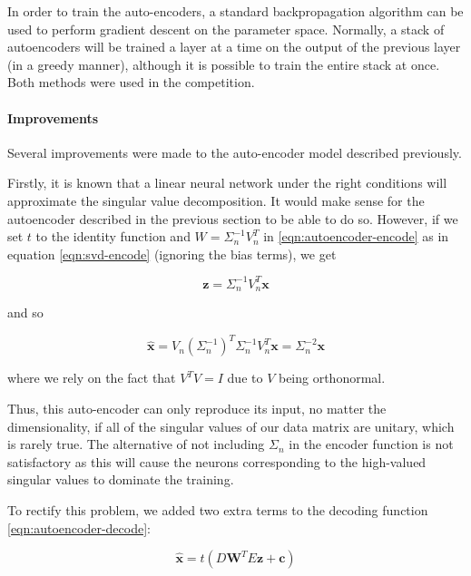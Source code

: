 \documentclass{article}
\begin{document}
In order to train the auto-encoders, a standard backpropagation algorithm can be used to perform gradient descent on the parameter space.  Normally, a stack of autoencoders will be trained a layer at a time on the output of the previous layer (in a greedy manner), although it is possible to train the entire stack at once.  Both methods were used in the competition.

\paragraph{Improvements}

Several improvements were made to the auto-encoder model described previously.

Firstly, it is known that a linear neural network under the right conditions will approximate the singular value decomposition.  It would make sense for the autoencoder described in the previous section to be able to do so.  However, if we set $t$ to the identity function and $W = \Sigma_n^{-1} V_n^T$ in \ref{eqn:autoencoder-encode} as in equation \ref{eqn:svd-encode} (ignoring the bias terms), we get

\begin{equation}
\mathbf{z} = \Sigma_n^{-1} V_n^T \mathbf{x}
\end{equation}

and so

\begin{equation}
\hat{\mathbf{x}} = V_n \left( \Sigma_n^{-1} \right)^T \Sigma_n^{-1} V_n^T \mathbf{x} = \Sigma_n^{-2} \mathbf{x}
\end{equation}

where we rely on the fact that $V^T V = I$ due to $V$ being orthonormal.

Thus, this auto-encoder can only reproduce its input, no matter the dimensionality, if all of the singular values of our data matrix are unitary, which is rarely true.  The alternative of not including $\Sigma_n$ in the encoder function is not satisfactory as this will cause the neurons corresponding to the high-valued singular values to dominate the training.

To rectify this problem, we added two extra terms to the decoding function \ref{eqn:autoencoder-decode}:

\begin{equation}
\label{eqn:autoencoder-decode}
\hat{\mathbf{x}} = t(D \mathbf{W}^T E \mathbf{z} + \mathbf{c})
\end{equation}
\end{document}
